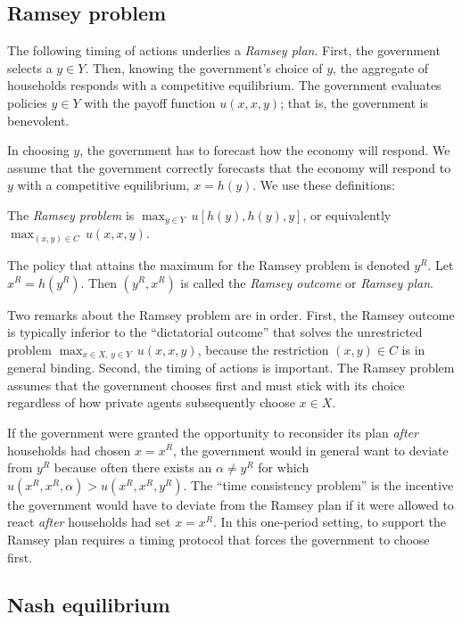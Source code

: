\subsection{Ramsey problem}

 The following timing of actions underlies a {\it Ramsey plan}.
First, the government selects a $y\in Y$.  Then, knowing the
government's choice of  $y$, the aggregate of households responds with
a competitive equilibrium.  The government evaluates policies
$y\in Y$ with the payoff function $u(x,x,y)$; that is,
the government is benevolent.

In choosing $y$, the government has to forecast how
the economy will respond.  We assume that the government correctly forecasts
 that the economy will respond to $y$ with a competitive
equilibrium, $x=h(y)$.  We use these definitions:

\medskip   {}
  The {\it Ramsey problem\/}
is $\max_{y\in Y}\, u[h(y),
h(y), y]$, or equivalently
$\max_{(x,y)\in C}\, u(x,x,y)$.

\medskip   {}
 The policy that attains the maximum for the Ramsey problem
is denoted $y^R$.  Let
$x^R=h(y^R)$.  Then
$(y^R,x^R)$ is called the
{\it Ramsey outcome\/} or {\it Ramsey plan}.

\medskip

Two remarks about the Ramsey problem are in order.  First, the Ramsey
outcome is typically inferior to the ``dictatorial outcome'' that
solves the unrestricted problem $\max_{x\in X,\,y\in Y}\, u(x,x,y)$,
because the restriction $(x,y)\in C$ is in general
binding.  Second, the timing of actions is important.
The Ramsey problem assumes that the government chooses first and must  stick with its choice
regardless of how private agents subsequently choose $x \in X$.

If the government were granted the opportunity to reconsider its plan
{\it after\/} households had chosen $x=x^R$, the government would in general want to
deviate from $y^R$ because often there exists
an $\alpha \not= y^R$ for which $u(x^R,x^R,\alpha)> u(x^R,x^R,y^R)$.
The ``time consistency problem'' is the incentive the government  would have
to deviate from
the Ramsey plan if it  were allowed to react {\it after\/} households had set $x=x^R$.
In this one-period setting, to support the Ramsey plan requires
a timing protocol that forces the government to choose first.
\subsection{Nash equilibrium}


